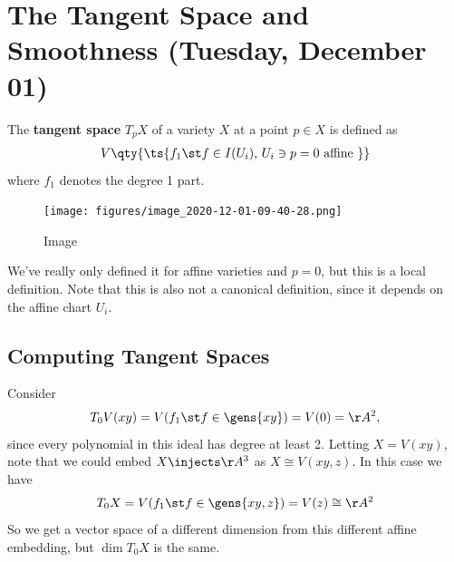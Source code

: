 \hypertarget{the-tangent-space-and-smoothness-tuesday-december-01}{%
\section{The Tangent Space and Smoothness (Tuesday, December
01)}\label{the-tangent-space-and-smoothness-tuesday-december-01}}

\begin{definition}

The \textbf{tangent space} \(T_p X\) of a variety \(X\) at a point
\(p\in X\) is defined as
\begin{align*}
V\qty{\ts{f_1 \st f\in I(U_i),\, U_i \ni p = 0 \text{ affine } }}
\end{align*} where \(f_1\) denotes the degree 1 part.

\begin{figure}
\centering
\texttt{[image: figures/image\_2020-12-01-09-40-28.png]}
\caption{Image}
\end{figure}

\end{definition}

\begin{remark}

We've really only defined it for affine varieties and \(p=0\), but this
is a local definition. Note that this is also not a canonical
definition, since it depends on the affine chart \(U_i\).

\end{remark}

\hypertarget{computing-tangent-spaces}{%
\subsection{Computing Tangent Spaces}\label{computing-tangent-spaces}}

\begin{example}[?]

Consider
\begin{align*}
T_0 V(xy) = V(f_1 \st f\in \gens{xy}) = V(0) = \AA^2
,\end{align*} since every polynomial in this ideal has degree at least
2. Letting \(X = V(xy)\), note that we could embed \(X\injects \AA^3\)
as \(X\cong V(xy, z)\). In this case we have
\begin{align*}
T_0 X = V(f_1 \st f\in \gens{xy, z}) = V(z) \cong \AA^2
\end{align*} So we get a vector space of a different dimension from this
different affine embedding, but \(\dim T_0 X\) is the same.

\end{example}

